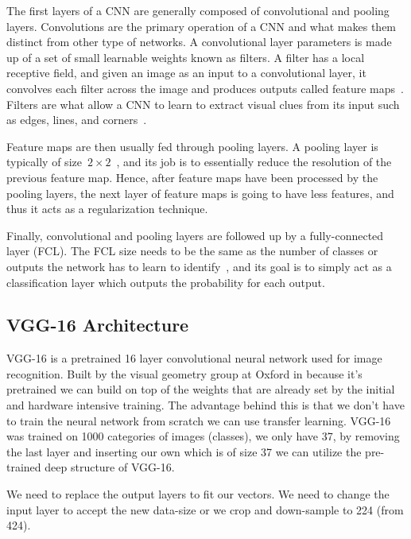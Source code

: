 The first layers of a CNN are generally composed of convolutional and pooling layers. Convolutions are the primary operation of a CNN and what makes them distinct from other type of networks. A convolutional layer parameters is made up of a set of small learnable weights known as filters. A filter has a local receptive field, and given an image as an input to a convolutional layer, it convolves each filter across the image and produces outputs called feature maps~\cite{cnn-star-galaxy}. Filters are what allow a CNN to learn to extract visual clues from its input such as edges, lines, and corners~\cite{Lecun99objectrecognition}.

Feature maps are then usually fed through pooling layers. A pooling layer is typically of size~$2 \times 2$~\cite{NIPS2012_4824}, and  its job is to essentially reduce the resolution of the previous feature map. Hence, after feature maps have been processed by the pooling layers, the next layer of feature maps is going to have less features, and thus it acts as a regularization technique.

Finally, convolutional and pooling layers are followed up by a fully-connected layer (FCL). The FCL size needs to be the same as the number of classes or outputs the network has to learn to identify~\cite{Ciresan11flexible}, and its goal is to simply act as a classification layer which outputs the probability for each output.

\subsection{VGG-16 Architecture}

VGG-16 is a pretrained 16 layer convolutional neural network used for image recognition. Built by the visual geometry group at Oxford in \citeyear{vgg16-arxiv} \cite{vgg16-arxiv} because it's pretrained we can build on top of the weights that are already set by the initial and hardware intensive training. The advantage behind this is that we don't have to train the neural network from scratch we can use transfer learning. VGG-16 was trained on 1000 categories of images (classes), we only have 37, by removing the last layer and inserting our own which is of size 37 we can utilize the pre-trained deep structure of VGG-16.



We need to replace the output layers to fit our vectors.
We need to change the input layer to accept the new data-size or we crop and down-sample to 224 (from 424).
